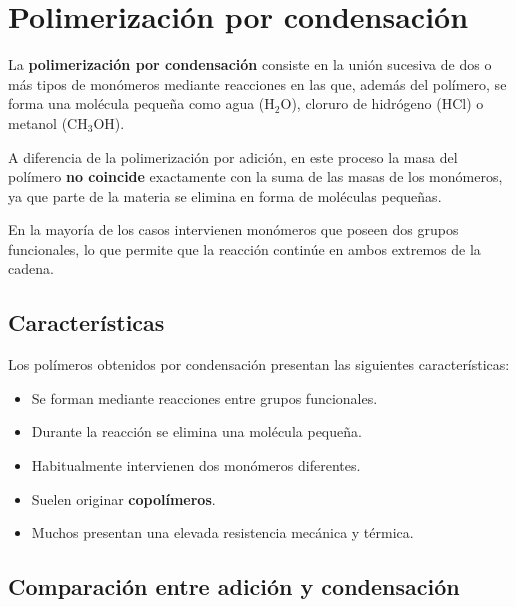 \section{Polimerización por condensación}

La \textbf{polimerización por condensación} consiste en la unión sucesiva de dos o más
tipos de monómeros mediante reacciones en las que, además del polímero, se forma una
molécula pequeña como agua (\(\mathrm{H_2O}\)), cloruro de hidrógeno
(\(\mathrm{HCl}\)) o metanol (\(\mathrm{CH_3OH}\)).

A diferencia de la polimerización por adición, en este proceso la masa del polímero
\textbf{no coincide} exactamente con la suma de las masas de los monómeros, ya que
parte de la materia se elimina en forma de moléculas pequeñas.

En la mayoría de los casos intervienen monómeros que poseen dos grupos funcionales,
lo que permite que la reacción continúe en ambos extremos de la cadena.


\subsection{Características}

Los polímeros obtenidos por condensación presentan las siguientes características:

\begin{itemize}

\item Se forman mediante reacciones entre grupos funcionales.

\item Durante la reacción se elimina una molécula pequeña.

\item Habitualmente intervienen dos monómeros diferentes.

\item Suelen originar \textbf{copolímeros}.

\item Muchos presentan una elevada resistencia mecánica y térmica.

\end{itemize}


\subsection{Comparación entre adición y condensación}

